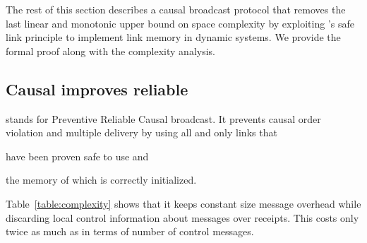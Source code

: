 
The rest of this section describes a causal broadcast protocol that removes the
last linear and monotonic upper bound on space complexity by exploiting
\PCBROADCAST's safe link principle to implement link memory in dynamic systems.
We provide the formal proof along with the complexity analysis.


\subsection{Causal improves reliable}


\RPCBROADCAST stands for Preventive Reliable Causal broadcast. It prevents
causal order violation and multiple delivery by using all and only links that
\begin{inparaenum}[(i)]
\item have been proven safe to use and
\item the memory of which is correctly initialized.
\end{inparaenum}
Table~\ref{table:complexity} shows that it keeps constant size message overhead
while discarding local control information about messages over receipts. This
costs only twice as much as \PCBROADCAST in terms of number of control messages.



